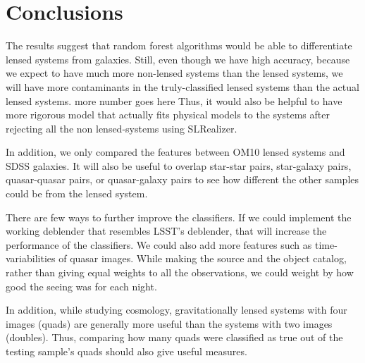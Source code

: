 \documentclass[\docopts]{\docclass}
\begin{document}

\section{Conclusions}
\label{sec:conclusions}

The results suggest that random forest algorithms would be able to differentiate lensed systems from galaxies. Still, even though we have high accuracy, because we expect to have much more non-lensed systems than the lensed systems, we will have more contaminants in the truly-classified lensed systems than the actual lensed systems. more number goes here Thus, it would also be helpful to have more rigorous model that actually fits physical models to the systems after rejecting all the non lensed-systems using SLRealizer.

In addition, we only compared the features between OM10 lensed systems and SDSS galaxies. It will also be useful to overlap star-star pairs, star-galaxy pairs, quasar-quasar pairs, or quasar-galaxy pairs to see how different the other samples could be from the lensed system.

There are few ways to further improve the classifiers. If we could implement the working deblender that resembles LSST’s deblender, that will increase the performance of the classifiers. We could also add more features such as time-variabilities of quasar images. While making the source and the object catalog, rather than giving equal weights to all the observations, we could weight by how good the seeing was for each night.

In addition, while studying cosmology, gravitationally lensed systems with four images (quads) are generally more useful than the systems with two images (doubles). Thus, comparing how many quads were classified as true out of the testing sample’s quads should also give useful measures.
\end{document}
